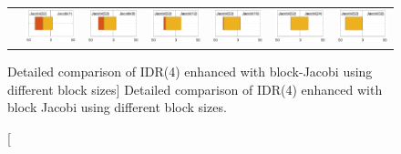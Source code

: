 \begin{landscape}
\begin{figure}
\begin{center}
{\begin{tabular}{c|cccccc}
\\
&
\includegraphics[width=.135\columnwidth]{plots/Jacobi(32)_vs_Jacobi(1).pdf}
&
\includegraphics[width=.135\columnwidth]{plots/Jacobi(32)_vs_Jacobi(8).pdf}
&
\includegraphics[width=.135\columnwidth]{plots/Jacobi(32)_vs_Jacobi(12).pdf}
&
\includegraphics[width=.135\columnwidth]{plots/Jacobi(32)_vs_Jacobi(16).pdf}
&
\includegraphics[width=.135\columnwidth]{plots/Jacobi(32)_vs_Jacobi(24).pdf}
&
 \includegraphics[width=.135\columnwidth]{plots/Jacobi(32)_vs_Jacobi(32).pdf}
\\
\end{tabular}
}
\end{center}
\caption
[Detailed comparison of IDR(4) enhanced with block-Jacobi
using different block sizes]
{
Detailed comparison of IDR(4) enhanced with block Jacobi
using different block sizes.
}
\label{2017-gje-block-jacobi:fig:solverperformance-detailed}
\end{figure}

\end{landscape}
